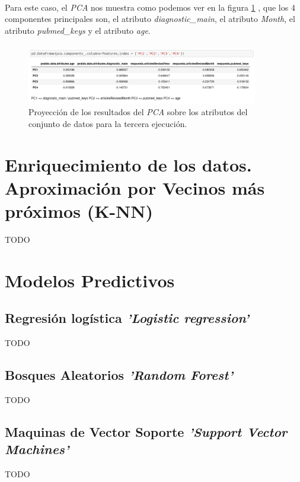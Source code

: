 \documentclass[10pt,a4paper,oneside]{book}
\begin{document}
\paragraph{}
Para este caso, el \textit{PCA} nos muestra como podemos ver en la figura \ref{pcaThreeAtributos} , que los 4 componentes principales son, el atributo \textit{diagnostic\_main}, el atributo \textit{Month}, el atributo \textit{pubmed\_keys} y el atributo \textit{age}.

\paragraph{}
\begin{figure}[!htb]
  \centering
    \includegraphics[width=0.9\textwidth]{images/metodologia_procesado_de_datos_pca3_atributos.png}
    \caption{Proyección de los resultados del \textit{PCA} sobre los atributos del conjunto de datos para la tercera ejecución.}
  \label{pcaThreeAtributos}
\end{figure}


\newpage
\section{Enriquecimiento de los datos. Aproximación por Vecinos más próximos (K-NN)}
TODO

\newpage
\section{Modelos Predictivos}

\subsection{Regresión logística \textit{'Logistic regression'}}
TODO

\subsection{Bosques Aleatorios \textit{'Random Forest'}}
TODO

\subsection{Maquinas de Vector Soporte \textit{'Support Vector Machines'}}
TODO
\end{document}
